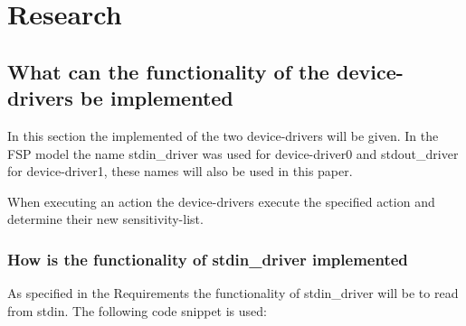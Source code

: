 \hypertarget{research}{%
\chapter{Research}\label{research}}

\hypertarget{what-can-the-functionality-of-the-device-drivers-be-implemented}{%
\section{What can the functionality of the device-drivers be
implemented}\label{what-can-the-functionality-of-the-device-drivers-be-implemented}}

In this section the implemented of the two device-drivers will be given.
In the FSP model the name stdin\_driver was used for device-driver0 and
stdout\_driver for device-driver1, these names will also be used in this
paper.

When executing an action the device-drivers execute the specified action
and determine their new sensitivity-list.

\hypertarget{how-is-the-functionality-of-stdin_driver-implemented}{%
\subsection{How is the functionality of stdin\_driver
implemented}\label{how-is-the-functionality-of-stdin_driver-implemented}}

As specified in the Requirements the functionality of stdin\_driver will
be to read from stdin. The following code snippet is used:

